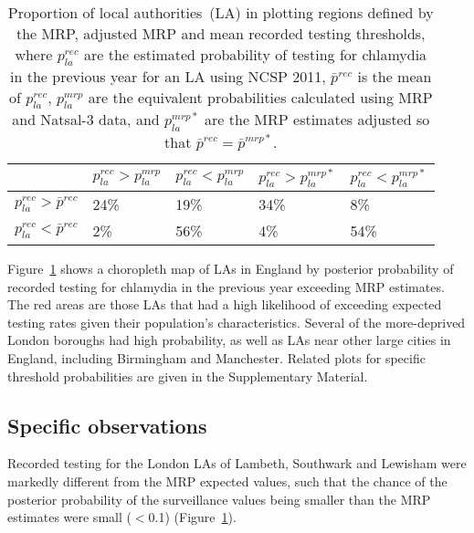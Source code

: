 \documentclass[fleqn,10pt]{wlscirep}
\begin{document}
\begin{table}[!ht]
\renewcommand*{\arraystretch}{1.5}
\centering
\begin{tabular}{|l|l|l|l|l|}
\hline 
 & $p_{la}^{rec} > p_{la}^{mrp}$
 & $p_{la}^{rec}< p_{la}^{mrp}$
 & $p_{la}^{rec} > p_{la}^{mrp*}$
 & $p_{la}^{rec}< p_{la}^{mrp*}$ \\
\hline
$p_{la}^{rec} > \bar{p}^{rec}$ & 24\% & 19\% & 34\% & 8\%\\
\hline
$p_{la}^{rec} < \bar{p}^{rec}$ & 2\% & 56\% & 4\% & 54\%\\
\hline
\end{tabular}
\caption{\label{tab:regions} Proportion of local authorities~(LA) in plotting regions defined by the MRP, adjusted MRP and mean recorded testing thresholds, where $p_{la}^{rec}$ are the estimated probability of testing for chlamydia in the previous year for an LA using NCSP 2011, $\bar{p}^{rec}$ is the mean of $p_{la}^{rec}$, $p_{la}^{mrp}$ are the equivalent probabilities calculated using MRP and Natsal-3 data, and $p_{la}^{mrp*}$ are the MRP estimates adjusted so that $\bar{p}^{rec} = \bar{p}^{mrp*}$.}
\end{table}

Figure~\ref{fig:choropleth} shows a choropleth map of LAs in England by posterior probability of recorded testing for chlamydia in the previous year exceeding MRP estimates. The red areas are those LAs that had a high likelihood of exceeding expected testing rates given their population’s characteristics. Several of the more-deprived London boroughs had high probability, as well as LAs near other large cities in England, including Birmingham and Manchester. Related plots for specific threshold probabilities are given in the Supplementary Material.

\subsection*{Specific observations}
Recorded testing for the London LAs of Lambeth, Southwark and Lewisham were markedly different from the MRP expected values, such that the chance of the posterior probability of the surveillance values being smaller than the MRP estimates were small ($<$0.1) (Figure~\ref{fig:choropleth}).

\begin{figure}[!ht]
\centering
\caption{}
\label{fig:choropleth}
\end{figure}
\end{document}
